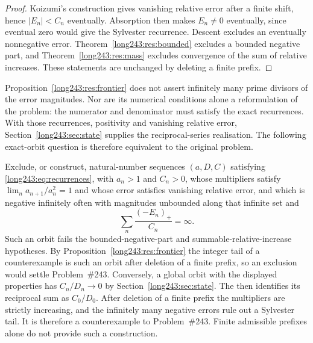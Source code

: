 \documentclass[11pt]{article}
\begin{document}
\begin{proof}
Koizumi's construction gives vanishing relative error after a finite
shift, hence $|E_n|<C_n$ eventually.
Absorption then makes $E_n\ne0$ eventually,
since eventual zero would give the Sylvester recurrence.  Descent excludes an
eventually nonnegative error.  Theorem~\ref{long243:res:bounded} excludes a bounded
negative part, and Theorem~\ref{long243:res:mass} excludes convergence of the sum of relative increases.  These statements are unchanged by deleting a finite prefix.
\end{proof}



Proposition~\ref{long243:res:frontier} does not assert infinitely many
prime divisors of the error magnitudes. Nor are its numerical conditions
alone a reformulation of the problem: the numerator and denominator
must satisfy the exact recurrences. With those recurrences, positivity
and vanishing relative error, Section~\ref{long243:sec:state} supplies
the reciprocal-series realisation. The following exact-orbit question
is therefore equivalent to the original problem.

\begin{problem}\label{long243:res:excursions}
Exclude, or construct, natural-number sequences $(a,D,C)$ satisfying
\eqref{long243:eq:recurrences}, with $a_n>1$ and
$C_n>0$, whose multipliers satisfy $\lim_n a_{n+1}/a_n^{2}=1$ and whose error satisfies vanishing relative error, and which is
negative infinitely often with magnitudes unbounded along that infinite set and
\[
 \sum_n\frac{(-E_n)_+}{C_n}=\infty .
\]
Such an orbit fails the bounded-negative-part and summable-relative-increase
hypotheses.
By Proposition~\ref{long243:res:frontier} the integer tail of a counterexample is
such an orbit after deletion of a finite prefix, so an exclusion would settle
Problem~\#243. Conversely, a global orbit with the displayed properties
has $C_n/D_n\to0$ by Section~\ref{long243:sec:state}. The
 then identifies its reciprocal sum as $C_0/D_0$.
After deletion of a finite prefix the multipliers are strictly increasing,
and the infinitely many negative errors rule out a Sylvester tail.
It is therefore a counterexample to Problem~\#243. Finite admissible
prefixes alone do not provide such a construction.
\end{problem}
\end{document}
